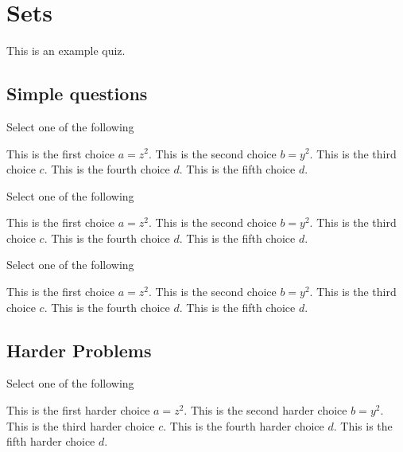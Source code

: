 \chapter{Sets}
\label{XXch:sets}

\begin{preamble}
This is an example quiz.
\end{preamble}


\section{Simple questions}
\label{XXsec:sets::math}


\begin{problem}[Choices I]
Select one of the following
\begin{choices}
\choice This is the first choice $a = z^2$.
\choice This is the second choice $b = y^2$.
\correctchoice This is the third choice $c$.
\correctchoice This is the fourth choice $d$.
\choice This is the fifth choice $d$.
\end{choices}
\end{problem}


\begin{problem}[Choices II]
Select one of the following
\begin{choices}
\choice This is the first choice $a = z^2$.
\choice This is the second choice $b = y^2$.
\correctchoice This is the third choice $c$.
\correctchoice This is the fourth choice $d$.
\choice This is the fifth choice $d$.
\end{choices}
\end{problem}

\begin{problem}
Select one of the following
\begin{choices}
\choice This is the first choice $a = z^2$.
\choice This is the second choice $b = y^2$.
\correctchoice This is the third choice $c$.
\correctchoice This is the fourth choice $d$.
\choice This is the fifth choice $d$.
\end{choices}
\end{problem}


\section{Harder Problems}

\begin{problem}
Select one of the following
\begin{choices}
\choice This is the first harder choice $a = z^2$.
\choice This is the second harder choice $b = y^2$.
\correctchoice This is the third harder choice $c$.
\correctchoice This is the fourth harder choice $d$.
\choice This is the fifth harder choice $d$.
\end{choices}
\end{problem}


